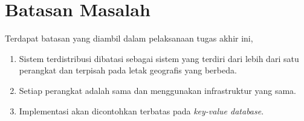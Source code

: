 \section{Batasan Masalah}

Terdapat batasan yang diambil dalam pelaksanaan tugas akhir ini,

\begin{enumerate}
    \item Sistem terdistribusi dibatasi sebagai sistem yang terdiri dari lebih dari satu perangkat dan terpisah pada letak geografis yang berbeda.
    \item Setiap perangkat adalah sama dan menggunakan infrastruktur yang sama.
    \item Implementasi akan dicontohkan terbatas pada \textit{key-value database}.
\end{enumerate}
  